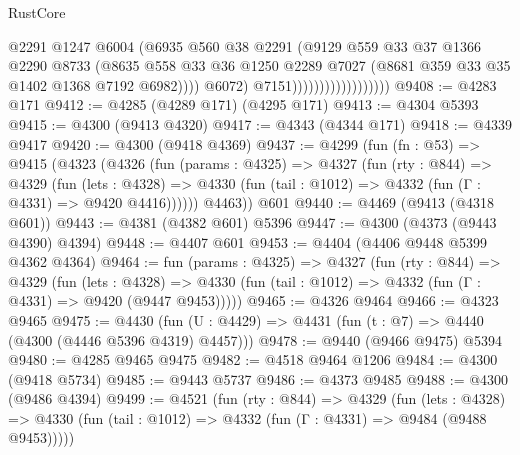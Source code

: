 \begin{lexlean}{RustCore}
\begin{coremodule}
                                          @2291
                                          @1247
                                          @6004
                                          (@6935
                                            @560
                                            @38
                                            @2291
                                            (@9129
                                              @559
                                              @33
                                              @37
                                              @1366
                                              @2290
                                              @8733
                                              (@8635
                                                @558
                                                @33
                                                @36
                                                @1250
                                                @2289
                                                @7027
                                                (@8681 @359 @33 @35 @1402 @1368 @7192 @6982))))
                                          @6072)
                                        @7151))))))))))))))))))
@9408 := @4283 @171
@9412 := @4285 (@4289 @171) (@4295 @171)
@9413 := @4304 @5393
@9415 := @4300 (@9413 @4320)
@9417 := @4343 (@4344 @171)
@9418 := @4339 @9417
@9420 := @4300 (@9418 @4369)
@9437 := @4299
    (fun (fn : @53) =>
    @9415
      (@4323
        (@4326
          (fun (params : @4325) =>
          @4327
            (fun (rty : @844) =>
            @4329
              (fun (lets : @4328) =>
              @4330 (fun (tail : @1012) => @4332 (fun (Γ : @4331) => @9420 @4416))))))
        @4463))
    @601
@9440 := @4469 (@9413 (@4318 @601))
@9443 := @4381 (@4382 @601) @5396
@9447 := @4300 (@4373 (@9443 @4390) @4394)
@9448 := @4407 @601
@9453 := @4404 (@4406 @9448 @5399 @4362 @4364)
@9464 := fun (params : @4325) =>
  @4327
    (fun (rty : @844) =>
    @4329
      (fun (lets : @4328) =>
      @4330 (fun (tail : @1012) => @4332 (fun (Γ : @4331) => @9420 (@9447 @9453)))))
@9465 := @4326 @9464
@9466 := @4323 @9465
@9475 := @4430 (fun (U : @4429) => @4431 (fun (t : @7) => @4440 (@4300 (@4446 @5396 @4319) @4457)))
@9478 := @9440 (@9466 @9475) @5394
@9480 := @4285 @9465 @9475
@9482 := @4518 @9464 @1206
@9484 := @4300 (@9418 @5734)
@9485 := @9443 @5737
@9486 := @4373 @9485
@9488 := @4300 (@9486 @4394)
@9499 := @4521
    (fun (rty : @844) =>
    @4329
      (fun (lets : @4328) =>
      @4330 (fun (tail : @1012) => @4332 (fun (Γ : @4331) => @9484 (@9488 @9453)))))

\end{coremodule}
\end{lexlean}
